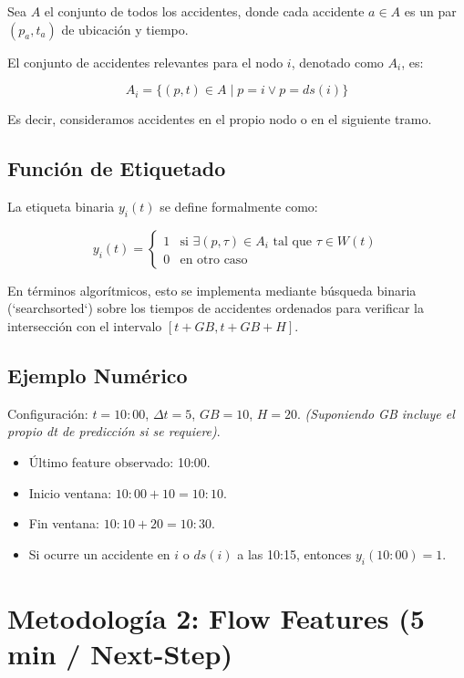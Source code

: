 \documentclass[11pt, letterpaper]{article}
\begin{document}
Sea $A$ el conjunto de todos los accidentes, donde cada accidente $a \in A$ es un par $(p_a, t_a)$ de ubicación y tiempo.

El conjunto de accidentes relevantes para el nodo $i$, denotado como $A_i$, es:

\begin{equation}
    A_i = \{ (p, t) \in A \mid p = i \lor p = ds(i) \}
\end{equation}

Es decir, consideramos accidentes en el propio nodo o en el siguiente tramo.

\subsection{Función de Etiquetado}
La etiqueta binaria $y_i(t)$ se define formalmente como:

\begin{equation}
    y_i(t) = 
    \begin{cases} 
    1 & \text{si } \exists (p, \tau) \in A_i \text{ tal que } \tau \in W(t) \\
    0 & \text{en otro caso}
    \end{cases}
\end{equation}

En términos algorítmicos, esto se implementa mediante búsqueda binaria (`searchsorted`) sobre los tiempos de accidentes ordenados para verificar la intersección con el intervalo $[t+GB, t+GB+H]$.

\subsection{Ejemplo Numérico}
Configuración: $t=10:00$, $\Delta t=5$, $GB=10$, $H=20$. \textit{(Suponiendo GB incluye el propio dt de predicción si se requiere)}.
\begin{itemize}
    \item Último feature observado: 10:00.
    \item Inicio ventana: $10:00 + 10 = 10:10$.
    \item Fin ventana: $10:10 + 20 = 10:30$.
    \item Si ocurre un accidente en $i$ o $ds(i)$ a las 10:15, entonces $y_i(10:00) = 1$.
\end{itemize}

\section{Metodología 2: Flow Features (5 min / Next-Step)}
\end{document}
